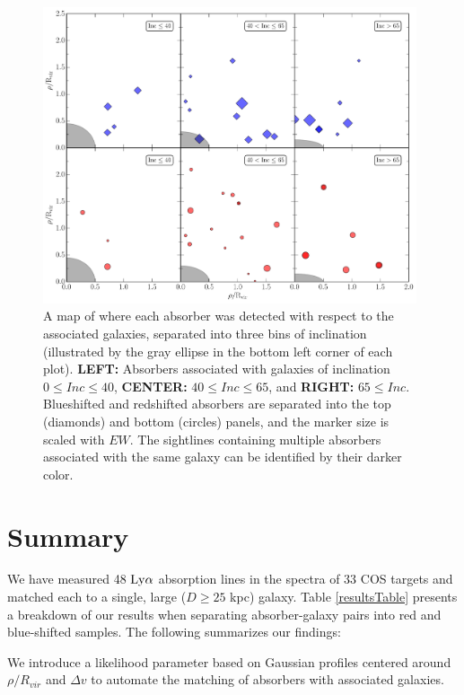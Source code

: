 \documentclass[iop]{emulateapj-rtx4}
\begin{document}
\begin{figure}[ht!]
        \centering
        \includegraphics[width=0.98\textwidth]{azimuthMap_separate.pdf}
        \caption{\small{A map of where each absorber was detected with respect to the associated galaxies, separated into three bins of inclination (illustrated by the gray ellipse in the bottom left corner of each plot). \textbf{LEFT:} Absorbers associated with galaxies of inclination $0 \leq Inc \le 40$, \textbf{CENTER:} $40 \leq Inc \le 65$, and \textbf{RIGHT: } $65 \leq Inc$. Blueshifted and redshifted absorbers are separated into the top (diamonds) and bottom (circles) panels, and the marker size is scaled with $EW$. The sightlines containing multiple absorbers associated with the same galaxy can be identified by their darker color.}}
        \label{azimuthMap}
        \vspace{5pt}
\end{figure} 



\section{Summary}


We have measured 48 $\rm Ly\alpha$ absorption lines in the spectra of 33 COS targets and matched each to a single, large ($D\geq 25$ kpc) galaxy. Table \ref{resultsTable} presents a breakdown of our results when separating absorber-galaxy pairs into red and blue-shifted samples. The following summarizes our findings:

\indent \textbullet \indent We introduce a likelihood parameter based on Gaussian profiles centered around $\rho / R_{vir}$ and $\Delta v$ to automate the matching of absorbers with associated galaxies. 
\end{document}

